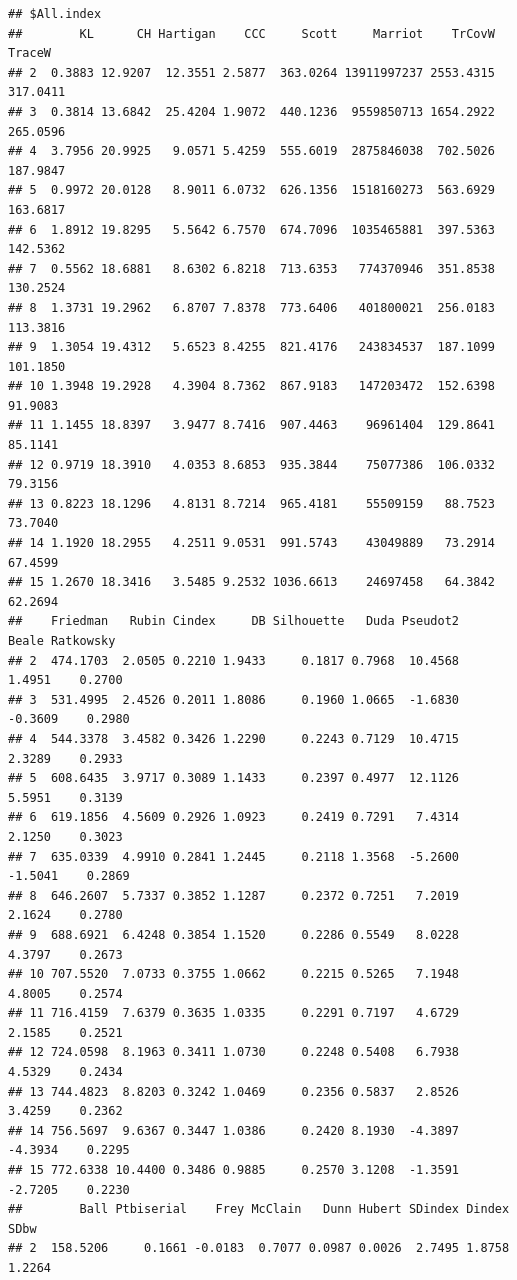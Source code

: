 \documentclass[
]{article}
\begin{document}
\begin{verbatim}
## $All.index
##        KL      CH Hartigan    CCC     Scott     Marriot    TrCovW   TraceW
## 2  0.3883 12.9207  12.3551 2.5877  363.0264 13911997237 2553.4315 317.0411
## 3  0.3814 13.6842  25.4204 1.9072  440.1236  9559850713 1654.2922 265.0596
## 4  3.7956 20.9925   9.0571 5.4259  555.6019  2875846038  702.5026 187.9847
## 5  0.9972 20.0128   8.9011 6.0732  626.1356  1518160273  563.6929 163.6817
## 6  1.8912 19.8295   5.5642 6.7570  674.7096  1035465881  397.5363 142.5362
## 7  0.5562 18.6881   8.6302 6.8218  713.6353   774370946  351.8538 130.2524
## 8  1.3731 19.2962   6.8707 7.8378  773.6406   401800021  256.0183 113.3816
## 9  1.3054 19.4312   5.6523 8.4255  821.4176   243834537  187.1099 101.1850
## 10 1.3948 19.2928   4.3904 8.7362  867.9183   147203472  152.6398  91.9083
## 11 1.1455 18.8397   3.9477 8.7416  907.4463    96961404  129.8641  85.1141
## 12 0.9719 18.3910   4.0353 8.6853  935.3844    75077386  106.0332  79.3156
## 13 0.8223 18.1296   4.8131 8.7214  965.4181    55509159   88.7523  73.7040
## 14 1.1920 18.2955   4.2511 9.0531  991.5743    43049889   73.2914  67.4599
## 15 1.2670 18.3416   3.5485 9.2532 1036.6613    24697458   64.3842  62.2694
##    Friedman   Rubin Cindex     DB Silhouette   Duda Pseudot2   Beale Ratkowsky
## 2  474.1703  2.0505 0.2210 1.9433     0.1817 0.7968  10.4568  1.4951    0.2700
## 3  531.4995  2.4526 0.2011 1.8086     0.1960 1.0665  -1.6830 -0.3609    0.2980
## 4  544.3378  3.4582 0.3426 1.2290     0.2243 0.7129  10.4715  2.3289    0.2933
## 5  608.6435  3.9717 0.3089 1.1433     0.2397 0.4977  12.1126  5.5951    0.3139
## 6  619.1856  4.5609 0.2926 1.0923     0.2419 0.7291   7.4314  2.1250    0.3023
## 7  635.0339  4.9910 0.2841 1.2445     0.2118 1.3568  -5.2600 -1.5041    0.2869
## 8  646.2607  5.7337 0.3852 1.1287     0.2372 0.7251   7.2019  2.1624    0.2780
## 9  688.6921  6.4248 0.3854 1.1520     0.2286 0.5549   8.0228  4.3797    0.2673
## 10 707.5520  7.0733 0.3755 1.0662     0.2215 0.5265   7.1948  4.8005    0.2574
## 11 716.4159  7.6379 0.3635 1.0335     0.2291 0.7197   4.6729  2.1585    0.2521
## 12 724.0598  8.1963 0.3411 1.0730     0.2248 0.5408   6.7938  4.5329    0.2434
## 13 744.4823  8.8203 0.3242 1.0469     0.2356 0.5837   2.8526  3.4259    0.2362
## 14 756.5697  9.6367 0.3447 1.0386     0.2420 8.1930  -4.3897 -4.3934    0.2295
## 15 772.6338 10.4400 0.3486 0.9885     0.2570 3.1208  -1.3591 -2.7205    0.2230
##        Ball Ptbiserial    Frey McClain   Dunn Hubert SDindex Dindex   SDbw
## 2  158.5206     0.1661 -0.0183  0.7077 0.0987 0.0026  2.7495 1.8758 1.2264

\end{verbatim}
\end{document}
